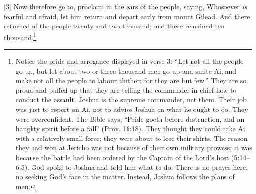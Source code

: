 [3] \textcolor[rgb]{0.00,0.00,1.00}{Now therefore go to, proclaim in the ears of the people, saying, Whosoever \emph{is} fearful and afraid, let him return and depart early from mount Gilead. And there returned of the people twenty and two thousand; and there remained ten thousand.}\footnote{Notice the pride and arrogance displayed in verse 3: “Let not all the people go up, but let about two or three thousand men go up and smite Ai; and make not all the people to labour thither; for they are but few.” They are so proud and puffed up that they are telling the commander-in-chief how to conduct the assault. Joshua is the supreme commander, not them. Their job was just to report on Ai, not to advise Joshua on what he ought to do. They were overconfident. The Bible says, “Pride goeth before destruction, and an haughty spirit before a fall” (Prov. 16:18). They thought they could take Ai with a relatively small force; they were about to lose their shirts. The reason they had won at Jericho was not because of their own military prowess; it was because the battle had been ordered by the Captain of the Lord’s host (5:14–6:5). God spoke to Joshua and told him what to do. There is no prayer here, no seeking God’s face in the matter. Instead, Joshua follows the plans of men.}
